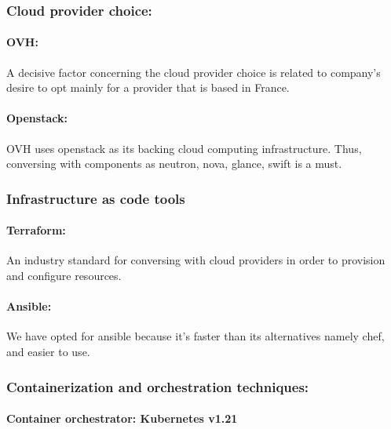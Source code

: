 \subsubsection{Cloud provider choice: } 

\paragraph{OVH\cite{OVHcloud}: }

A decisive factor concerning the cloud provider choice is related to company’s desire to opt mainly for a provider that is based in France.  

\paragraph{Openstack\cite{OpenStack}: }

OVH uses openstack as its backing cloud computing infrastructure. Thus, conversing with components as neutron, nova, glance, swift is a must. 

\subsubsection{Infrastructure as code tools }

\paragraph{Terraform\cite{Terraform}: }

An industry standard for conversing with cloud providers in order to provision and configure resources. 

\paragraph{Ansible\cite{Ansible}: }

We have opted for ansible because it’s faster than its alternatives namely chef, and easier to use.  

\subsubsection{Containerization and orchestration techniques: }

\paragraph{Container orchestrator: Kubernetes v1.21\cite{Kubernetes} }

